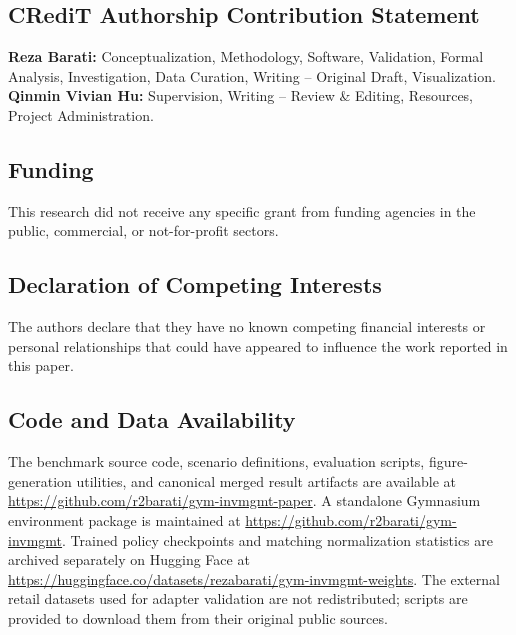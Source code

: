 \documentclass[10pt,a4paper]{article}
\begin{document}
\subsection*{CRediT Authorship Contribution Statement}

\textbf{Reza Barati:} Conceptualization, Methodology, Software,
Validation, Formal Analysis, Investigation, Data Curation, Writing
-- Original Draft, Visualization.
\textbf{Qinmin Vivian Hu:} Supervision, Writing -- Review \& Editing,
Resources, Project Administration.

\subsection*{Funding}

This research did not receive any specific grant from funding agencies
in the public, commercial, or not-for-profit sectors.

\subsection*{Declaration of Competing Interests}

The authors declare that they have no known competing financial
interests or personal relationships that could have appeared to
influence the work reported in this paper.

\subsection*{Code and Data Availability}

The benchmark source code, scenario definitions, evaluation scripts,
figure-generation utilities, and canonical merged result artifacts are
available at \url{https://github.com/r2barati/gym-invmgmt-paper}.
A standalone Gymnasium environment package is maintained at
\url{https://github.com/r2barati/gym-invmgmt}. Trained policy checkpoints
and matching normalization statistics are archived separately on Hugging
Face at \url{https://huggingface.co/datasets/rezabarati/gym-invmgmt-weights}.
The external retail datasets used for adapter validation are not
redistributed; scripts are provided to download them from their original
public sources.
\end{document}
